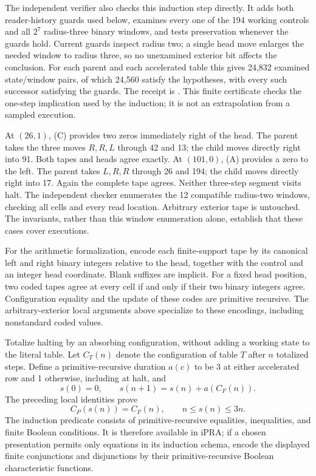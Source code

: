 The independent verifier also checks this induction step directly. It adds
both reader-history guards used below, examines every one of the 194
working controls and all $2^7$ radius-three binary windows, and tests
preservation whenever the guards hold. Current guards inspect radius two;
a single head move enlarges the needed window to radius three, so no
unexamined exterior bit affects the conclusion. For each parent and each
accelerated table this gives 24,832 examined state/window pairs, of which
24,560 satisfy the hypotheses, with every such successor satisfying the
guards. The receipt is . This finite
certificate checks the one-step implication used by the induction; it
is not an extrapolation from a sampled execution.

At $(26,1)$, (C) provides two zeros immediately right of the head.
The parent takes the three moves $R,R,L$ through 42 and 13; the child
moves directly right into 91. Both tapes and heads agree exactly.
At $(101,0)$, (A) provides a zero to the left. The parent takes $L,R,R$
through 26 and 194; the child moves directly right into 17. Again the
complete tape agrees. Neither three-step segment visits halt.
The independent checker enumerates the 12 compatible radius-two windows,
checking all cells and every read location. Arbitrary exterior tape is
untouched. The invariants, rather than this window enumeration alone,
establish that these cases cover executions.

For the arithmetic formalization, encode each finite-support tape by its
canonical left and right binary integers relative to the head, together
with the control and an integer head coordinate. Blank suffixes are
implicit. For a fixed head position, two coded tapes agree at every cell
if and only if their two binary integers agree. Configuration equality and the update of these
codes are primitive recursive. The arbitrary-exterior local arguments
above specialize to these encodings, including nonstandard coded values.

Totalize halting by an absorbing configuration, without adding a working
state to the literal table. Let $C_T(n)$ denote the configuration of table
$T$ after $n$ totalized steps. Define a primitive-recursive duration $a(c)$
to be 3 at either accelerated row and 1 otherwise, including at halt, and
\[
 s(0)=0,\qquad s(n+1)=s(n)+a(C_F(n)).
\]
The preceding local identities prove
\[
 C_P(s(n))=C_F(n),\qquad n\le s(n)\le3n.\tag{1}
\]
The induction predicate consists of primitive-recursive equalities,
inequalities, and finite Boolean conditions. It is therefore available in
iPRA; if a chosen presentation permits only equations in its induction
schema, encode the displayed finite conjunctions and disjunctions by their
primitive-recursive Boolean characteristic functions.


